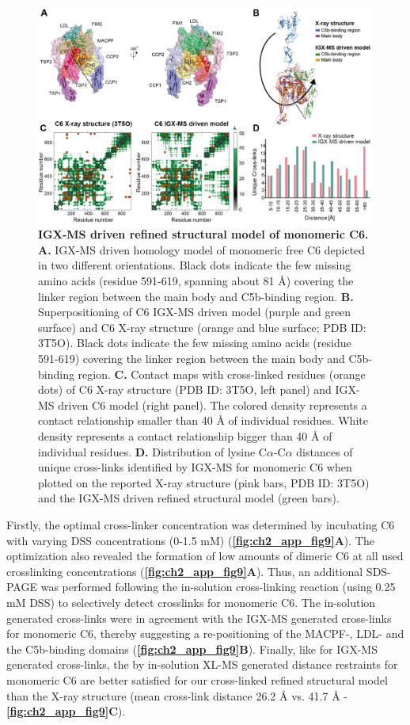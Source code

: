 \begin{figure}[h]
    \center
    \includegraphics[]{Chapter.2/Figures/Figure6.png}
    \caption{\textbf{IGX-MS driven refined structural model of monomeric C6.} \textbf{A.} IGX-MS driven homology model of monomeric free C6 depicted in two different orientations. Black dots indicate the few missing amino acids (residue 591-619, spanning about 81 Å) covering the linker region between the main body and C5b-binding region. \textbf{B.} Superpositioning of C6 IGX-MS driven model (purple and green surface) and C6 X-ray structure (orange and blue surface; PDB ID: 3T5O). Black dots indicate the few missing amino acids (residue 591-619) covering the linker region between the main body and C5b-binding region. \textbf{C.} Contact maps with cross-linked residues (orange dots) of C6 X-ray structure (PDB ID: 3T5O, left panel) and IGX-MS driven C6 model (right panel). The colored density represents a contact relationship smaller than 40 Å of individual residues. White density represents a contact relationship bigger than 40 Å of individual residues. \textbf{D.} Distribution of lysine C$\alpha$-C$\alpha$ distances of unique cross-links identified by IGX-MS for monomeric C6 when plotted on the reported X-ray structure (pink bars, PDB ID: 3T5O) and the IGX-MS driven refined structural model (green bars).}
    \label{fig:ch2_fig6}
\end{figure}
Firstly, the optimal cross-linker concentration was determined by incubating C6 with varying DSS concentrations (0-1.5 mM) (\textbf{\autoref{fig:ch2_app_fig9}A}). The optimization also revealed the formation of low amounts of dimeric C6 at all used crosslinking concentrations (\textbf{\autoref{fig:ch2_app_fig9}A}). Thus, an additional SDS-PAGE was performed following the in-solution cross-linking reaction (using 0.25 mM DSS) to selectively detect crosslinks for monomeric C6. The in-solution generated cross-links were in agreement with the IGX-MS generated cross-links for monomeric C6, thereby suggesting a re-positioning of the MACPF-, LDL- and the C5b-binding domains (\textbf{\autoref{fig:ch2_app_fig9}B}). Finally, like for IGX-MS generated cross-links, the by in-solution XL-MS generated distance restraints for monomeric C6 are better satisfied for our cross-linked refined structural model than the X-ray structure (mean cross-link distance 26.2 Å vs. 41.7 Å - \textbf{\autoref{fig:ch2_app_fig9}C}).
%
